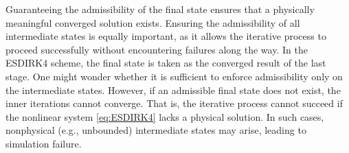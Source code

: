 Guaranteeing the admissibility of the final state ensures that a physically meaningful converged solution exists. Ensuring the admissibility of all intermediate states is equally important, as it allows the iterative process to proceed successfully without encountering failures along the way. 
In the ESDIRK4 scheme, the final state is taken as the converged result of the last stage. One might wonder whether it is sufficient to enforce admissibility only on the intermediate states. However, if an admissible final state does not exist, the inner iterations cannot converge. That is, the iterative process cannot succeed if the nonlinear system \eqref{eq:ESDIRK4} lacks a physical solution. In such cases, nonphysical (e.g., unbounded) intermediate states may arise, leading to simulation failure.


